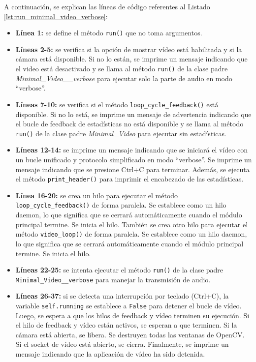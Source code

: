 A continuación, se explican las líneas de código referentes al Listado \ref{lst:run_minimal_video_verbose}:
\begin{itemize}
    \item \textbf{Línea 1:} se define el método \texttt{run()} que no toma argumentos.
    \item \textbf{Líneas 2-5:} se verifica si la opción de mostrar vídeo está habilitada y si la cámara está disponible. Si no lo están, se imprime un mensaje indicando que el video está desactivado y se llama al método \texttt{run()} de la clase padre \textit{Minimal\_Video\_\_verbose} para ejecutar solo la parte de audio en modo ``verbose''.
    \item \textbf{Líneas 7-10:} se verifica si el método \texttt{loop\_cycle\_feedback()} está disponible. Si no lo está, se imprime un mensaje de advertencia indicando que el bucle de feedback de estadísticas no está disponible y se llama al método \texttt{run()} de la clase padre \textit{Minimal\_Video} para ejecutar sin estadísticas.
    \item \textbf{Líneas 12-14:} se imprime un mensaje indicando que se iniciará el vídeo con un bucle unificado y protocolo simplificado en modo ``verbose''. Se imprime un mensaje indicando que se presione Ctrl+C para terminar. Además, se ejecuta el método \texttt{print\_header()} para imprimir el encabezado de las estadísticas.
    \item \textbf{Línea 16-20:} se crea un hilo para ejecutar el método \texttt{loop\_cycle\_feedback()} de forma paralela. Se establece como un hilo daemon, lo que significa que se cerrará automáticamente cuando el módulo principal termine. Se inicia el hilo. También se crea otro hilo para ejecutar el método \texttt{video\_loop()} de forma paralela. Se establece como un hilo daemon, lo que significa que se cerrará automáticamente cuando el módulo principal termine. Se inicia el hilo.
    \item \textbf{Líneas 22-25:} se intenta ejecutar el método \texttt{run()} de la clase padre \texttt{Minimal\_Video\_\_verbose} para manejar la transmisión de audio.
    \item \textbf{Líneas 26-37:} si se detecta una interrupción por teclado (Ctrl+C), la variable \texttt{self.running} se establece a \texttt{False} para detener el bucle de vídeo. Luego, se espera a que los hilos de feedback y vídeo terminen su ejecución. Si el hilo de feedback y vídeo están activos, se esperan a que terminen. Si la cámara está abierta, se libera. Se destruyen todas las ventanas de OpenCV. Si el socket de vídeo está abierto, se cierra. Finalmente, se imprime un mensaje indicando que la aplicación de vídeo ha sido detenida.
\end{itemize}
\vspace{\baselineskip}

